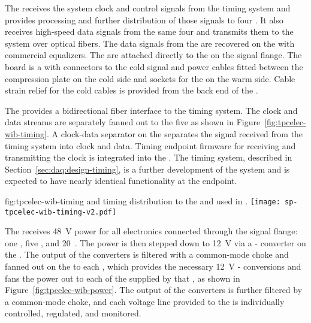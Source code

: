 The  
receives the system clock and control signals from the
timing system and provides processing and further distribution of those signals to four
. 
It also receives high-speed data signals from the same four 
 and transmits them to the  system over optical
fibers. The data signals from the  are recovered on the  with commercial 
equalizers. The  are attached directly to the 
 \fdth on the signal flange. The \fdth board is a  
with connectors to the cold signal and  power cables fitted
between the compression plate on the cold side and sockets for
the  on the warm side. Cable strain relief for the cold cables is 
provided from the back end of the \fdth.

The  provides a bidirectional fiber interface to the
timing system. The clock and data streams are separately fanned out to the 
five  as shown in Figure~\ref{fig:tpcelec-wib-timing}. 
A clock-data separator on the 
 separates the signal received from the timing system into clock and data. 
Timing endpoint firmware for receiving and transmitting 
the clock is integrated into the  .
The  timing system, described in Section~\ref{sec:daq:design-timing}, 
is a further development of the  system and is expected to have nearly identical 
functionality at the  endpoint.

\begin{dunefigure}
{fig:tpcelec-wib-timing}
{ and timing distribution to the  and  used in .}
\texttt{[image: sp-tpcelec-wib-timing-v2.pdf]}
\end{dunefigure}

The  receives \SI{48}{V}  power for all  
electronics connected through the  signal flange: 
one , five , and \num{20}~. 
The  power is then stepped down to \SI{12}{V} via 
a - converter on the . The output 
of the  converters is filtered with a common-mode choke 
and fanned out on the  to each , which provides the 
necessary \SI{12}{V} - conversions and fans
the  power out to each of the   supplied 
by that , as shown in Figure~\ref{fig:tpcelec-wib-power}. 
The output of the  converters is further filtered by a 
common-mode choke, and each voltage line provided to the 
is individually controlled, regulated, and monitored.

